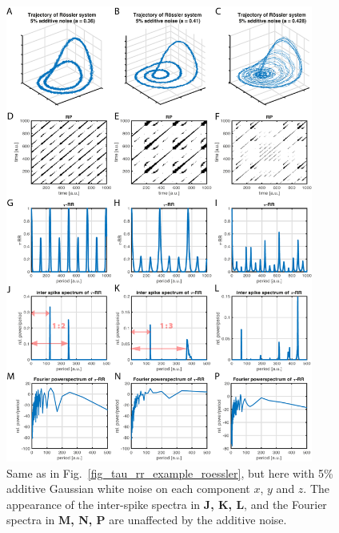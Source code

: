 \documentclass[entropy,article,submit,pdftex,moreauthors]{Definitions/mdpi}
\begin{document}
\begin{figure}[h!]
 \centering
 \includegraphics[width=0.9\textwidth]{./figures/fig_tau_rr_example_roessler_noise}
 \caption{Same as in Fig.~\ref{fig_tau_rr_example_roessler}, but here with 5\% additive Gaussian white noise on each component $x$, $y$ and $z$. The appearance of the inter-spike spectra 
 in \textbf{J, K, L}, and the Fourier spectra in \textbf{M, N, P} are unaffected by the additive noise.}
\label{fig_tau_rr_example_roessler_noise}
\end{figure}

\clearpage 
\end{document}
